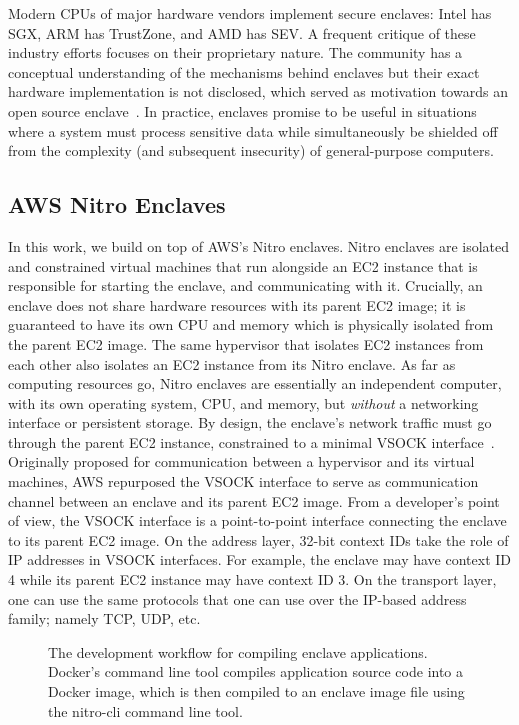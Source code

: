 Modern CPUs of major hardware vendors implement secure enclaves: Intel has SGX,
ARM has TrustZone, and AMD has SEV.  A frequent critique of these industry
efforts focuses on their proprietary nature. The community has a conceptual
understanding of the mechanisms behind enclaves but their exact hardware
implementation is not disclosed, which served as motivation towards an open
source enclave~\cite{Lee20a}.  In practice, enclaves promise to be useful in
situations where a system must process sensitive data while simultaneously be
shielded off from the complexity (and subsequent insecurity) of general-purpose
computers.

\subsection{AWS Nitro Enclaves}
\label{sec:nitro}

In this work, we build on top of AWS's Nitro enclaves.  Nitro enclaves are
isolated and constrained virtual machines that run alongside an EC2 instance
that is responsible for starting the enclave, and communicating with it.
Crucially, an enclave does not share hardware resources with its parent EC2
image; it is guaranteed to have its own CPU and memory which is physically
isolated from the parent EC2 image.  The same hypervisor that isolates EC2
instances from each other also isolates an EC2 instance from its Nitro enclave.
As far as computing resources go, Nitro enclaves are essentially an independent
computer, with its own operating system, CPU, and memory, but \emph{without} a
networking interface or persistent storage.  By design, the enclave's network
traffic must go through the parent EC2 instance, constrained to a minimal VSOCK
interface~\cite{vsock}. Originally proposed for communication between a
hypervisor and its virtual machines, AWS repurposed the VSOCK interface to serve
as communication channel between an enclave and its parent EC2 image.  From a
developer's point of view, the VSOCK interface is a point-to-point interface
connecting the enclave to its parent EC2 image.  On the address layer, 32-bit
context IDs take the role of IP addresses in VSOCK interfaces.  For example, the
enclave may have context ID 4 while its parent EC2 instance may have context ID
3.  On the transport layer, one can use the same protocols that one can use over
the IP-based address family; namely TCP, UDP, etc.

\begin{figure}[t]
  \centering
  
  \caption{The development workflow for compiling enclave applications.
  Docker's command line tool compiles application source code into a Docker
  image, which is then compiled to an enclave image file using the nitro-cli
  command line tool.}
  \label{fig:dev-workflow}
\end{figure}


